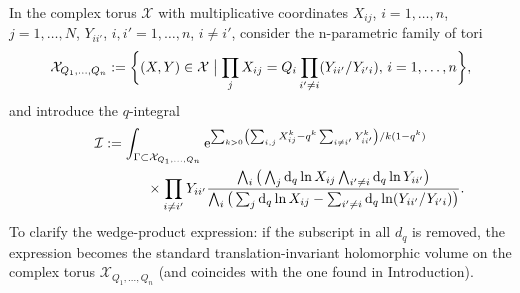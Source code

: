 \documentclass[10pt,a4paper]{amsart}
\numberwithin{equation}{section}
\def\I{\mathcal I}
\def\X{\mathcal X}
\theoremstyle{definition}
\theoremstyle{plain}
\begin{document}
In the complex torus $\X$ with multiplicative coordinates $X_{ij}$, $i=1,\dots,n$, $j=1,\dots,N$, $Y_{ii'}$, $i,i'=1,\dots,n$, $i\neq i'$, consider the n-parametric family of tori
\[
\X_{Q_1,\dots,Q_n}:=\bigg\{ (X,Y)\in \X \bigm| \prod_jX_{ij}=Q_i
\prod_{i'\neq i}(Y_{ii'}/Y_{i'i}),\, i=1,\dots, n \bigg\},
\]
and introduce the $q$-integral
\begin{gather*}
\I:= \int_{\Gamma\subset \X_{Q_1,\dots,Q_n}} {\rm e}^{ \sum_{k>0}\left(\sum_{i,j}X_{ij}^k -q^k\sum_{i\neq i'}Y_{ii'}^{k}\right)/k(1-q^k)}
\\ \hphantom{\I:= \int_{\Gamma\subset \X_{Q_1,\dots}}}
{}\times \prod_{i\neq i'} Y_{ii'} \frac{\bigwedge_i \big(\bigwedge_j {\rm d}_q\ln X_{ij} \bigwedge_{i'\neq i}{\rm d}_q\ln Y_{ii'}\big)}{\bigwedge_i
\big(\sum_j{\rm d}_q\ln X_{ij} -\sum_{i'\neq i}{\rm d}_q\ln (Y_{ii'}/Y_{i'i})\big)}.
\end{gather*}
To clarify the wedge-product expression: if the subscript in all $d_q$ is removed, the expression becomes the standard translation-invariant holomorphic volume on the complex torus $\X_{Q_1,\dots,Q_n}$ (and coincides with the one found in Introduction).
\end{document}
